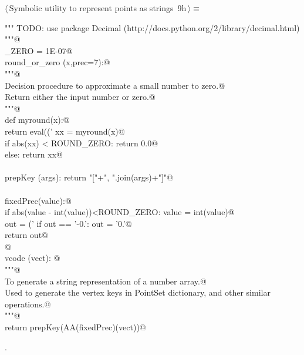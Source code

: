 \documentclass[11pt,oneside]{article}	%
\begin{document}
\begin{flushleft} \small \label{scrap26}
\protect{}$\langle\,$Symbolic utility to represent points as strings\nobreak\ {\footnotesize 9h}$\,\rangle\equiv$
\vspace{-1ex}
\begin{list}{}{} \item
\mbox{}\verb@""" TODO: use package Decimal (http://docs.python.org/2/library/decimal.html) """@\\
\mbox{}\verb@ROUND_ZERO = 1E-07@\\
\mbox{}\verb@def round_or_zero (x,prec=7):@\\
\mbox{}\verb@   """@\\
\mbox{}\verb@   Decision procedure to approximate a small number to zero.@\\
\mbox{}\verb@   Return either the input number or zero.@\\
\mbox{}\verb@   """@\\
\mbox{}\verb@   def myround(x):@\\
\mbox{}\verb@      return eval(('%.'+str(prec)+'f') % round(x,prec))@\\
\mbox{}\verb@   xx = myround(x)@\\
\mbox{}\verb@   if abs(xx) < ROUND_ZERO: return 0.0@\\
\mbox{}\verb@   else: return xx@\\
\mbox{}\verb@@\\
\mbox{}\verb@def prepKey (args): return "["+", ".join(args)+"]"@\\
\mbox{}\verb@@\\
\mbox{}\verb@def fixedPrec(value):@\\
\mbox{}\verb@   if abs(value - int(value))<ROUND_ZERO: value = int(value)@\\
\mbox{}\verb@   out = ('%0.7f'% value).rstrip('0')@\\
\mbox{}\verb@   if out == '-0.': out = '0.'@\\
\mbox{}\verb@   return out@\\
\mbox{}\verb@   @\\
\mbox{}\verb@def vcode (vect): @\\
\mbox{}\verb@   """@\\
\mbox{}\verb@   To generate a string representation of a number array.@\\
\mbox{}\verb@   Used to generate the vertex keys in PointSet dictionary, and other similar operations.@\\
\mbox{}\verb@   """@\\
\mbox{}\verb@   return prepKey(AA(fixedPrec)(vect))@\\
\mbox{}\verb@@{\NWsep}
\end{list}
\vspace{-1ex}
\footnotesize\addtolength{\baselineskip}{-1ex}
\begin{list}{}{\setlength{\itemsep}{-\parsep}\setlength{\itemindent}{-\leftmargin}}
\item {\NWtxtMacroNoRef}.
\end{list}
\end{flushleft}




\end{document}
